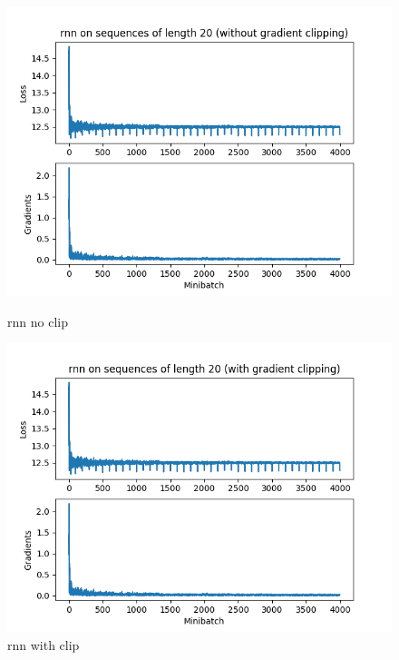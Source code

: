 \documentclass{article}[11pt]
\begin{document}
\begin{enumerate}[(a)]
\begin{figure}[H]
\begin{minipage}{0.5\linewidth}
\begin{center}
        \includegraphics[width=\linewidth]{../assignment3/q3-noclip-rnn.png}
        \caption{rnn no clip}
      \end{center}
    \end{minipage}
    \begin{minipage}{0.5\linewidth}
      \begin{center}
        \includegraphics[width=\linewidth]{../assignment3/q3-clip-rnn.png}
        \caption{rnn with clip}
      \end{center}
    \end{minipage}
    \begin{minipage}{0.5\linewidth}
      \begin{center}

\end{center}
\end{minipage}
\end{figure}
\end{enumerate}
\end{document}
